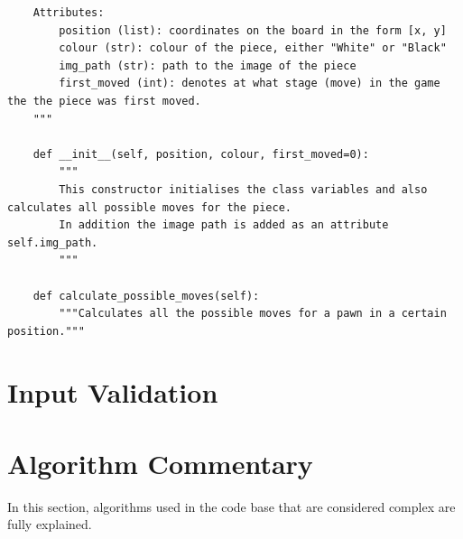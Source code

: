 \documentclass[twoside, 12pt]{report}
\begin{document}
\begin{verbatim}
	Attributes:
		position (list): coordinates on the board in the form [x, y]
		colour (str): colour of the piece, either "White" or "Black"
		img_path (str): path to the image of the piece
		first_moved (int): denotes at what stage (move) in the game the the piece was first moved.
	"""

	def __init__(self, position, colour, first_moved=0):
		"""
		This constructor initialises the class variables and also calculates all possible moves for the piece.
		In addition the image path is added as an attribute self.img_path.
		"""
	
 	def calculate_possible_moves(self):
		"""Calculates all the possible moves for a pawn in a certain position."""
\end{verbatim}
\section{Input Validation}
\begin{table}[H]
\centering
	\caption{Table of information on input validation.}
\end{table}
\section{Algorithm Commentary}
In this section, algorithms used in the code base that are considered complex are fully explained.
\end{document}
